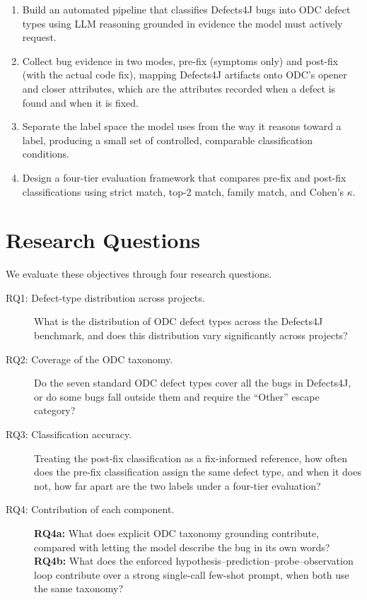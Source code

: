 \documentclass{iutbscthesis}
\begin{document}
\begin{enumerate}
    \item[\textbf{RO-1:}] Build an automated pipeline that classifies Defects4J bugs into ODC defect types using LLM reasoning grounded in evidence the model must actively request.
    \item[\textbf{RO-2:}] Collect bug evidence in two modes, pre-fix (symptoms only) and post-fix (with the actual code fix), mapping Defects4J artifacts onto ODC's opener and closer attributes, which are the attributes recorded when a defect is found and when it is fixed.
    \item[\textbf{RO-3:}] Separate the label space the model uses from the way it reasons toward a label, producing a small set of controlled, comparable classification conditions.
    \item[\textbf{RO-4:}] Design a four-tier evaluation framework that compares pre-fix and post-fix classifications using strict match, top-2 match, family match, and Cohen's $\kappa$.
\end{enumerate}

\section{Research Questions}
\label{sec:rqs}

We evaluate these objectives through four research questions.

\begin{description}
    \item[RQ1: Defect-type distribution across projects.] What is the distribution of ODC defect types across the Defects4J benchmark, and does this distribution vary significantly across projects?

    \item[RQ2: Coverage of the ODC taxonomy.] Do the seven standard ODC defect types cover all the bugs in Defects4J, or do some bugs fall outside them and require the ``Other'' escape category?

    \item[RQ3: Classification accuracy.] Treating the post-fix classification as a fix-informed reference, how often does the pre-fix classification assign the same defect type, and when it does not, how far apart are the two labels under a four-tier evaluation?

    \item[RQ4: Contribution of each component.] \textbf{RQ4a:} What does explicit ODC taxonomy grounding contribute, compared with letting the model describe the bug in its own words? \textbf{RQ4b:} What does the enforced hypothesis--prediction--probe--observation loop contribute over a strong single-call few-shot prompt, when both use the same taxonomy?
\end{description}
\end{document}
